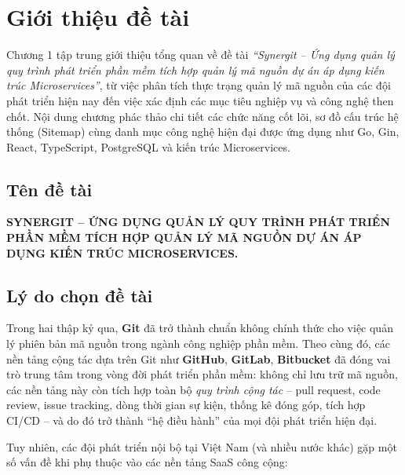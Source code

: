 \chapter{Giới thiệu đề tài}

Chương 1 tập trung giới thiệu tổng quan về đề tài \textit{``Synergit -- Ứng dụng quản lý quy trình phát triển phần mềm tích hợp quản lý mã nguồn dự án áp dụng kiến trúc Microservices''}, từ việc phân tích thực trạng quản lý mã nguồn của các đội phát triển hiện nay đến việc xác định các mục tiêu nghiệp vụ và công nghệ then chốt. Nội dung chương phác thảo chi tiết các chức năng cốt lõi, sơ đồ cấu trúc hệ thống (Sitemap) cùng danh mục công nghệ hiện đại được ứng dụng như Go, Gin, React, TypeScript, PostgreSQL và kiến trúc Microservices.

\section{Tên đề tài}
\textbf{SYNERGIT -- ỨNG DỤNG QUẢN LÝ QUY TRÌNH PHÁT TRIỂN PHẦN MỀM TÍCH HỢP QUẢN LÝ MÃ NGUỒN DỰ ÁN ÁP DỤNG KIẾN TRÚC MICROSERVICES.}

\section{Lý do chọn đề tài}
Trong hai thập kỷ qua, \textbf{Git} đã trở thành chuẩn không chính thức cho việc quản lý phiên bản mã nguồn trong ngành công nghiệp phần mềm. Theo cùng đó, các nền tảng cộng tác dựa trên Git như \textbf{GitHub}, \textbf{GitLab}, \textbf{Bitbucket} đã đóng vai trò trung tâm trong vòng đời phát triển phần mềm: không chỉ lưu trữ mã nguồn, các nền tảng này còn tích hợp toàn bộ \textit{quy trình cộng tác} -- pull request, code review, issue tracking, dòng thời gian sự kiện, thống kê đóng góp, tích hợp CI/CD -- và do đó trở thành ``hệ điều hành'' của mọi đội phát triển hiện đại.

Tuy nhiên, các đội phát triển nội bộ tại Việt Nam (và nhiều nước khác) gặp một số vấn đề khi phụ thuộc vào các nền tảng SaaS công cộng:

